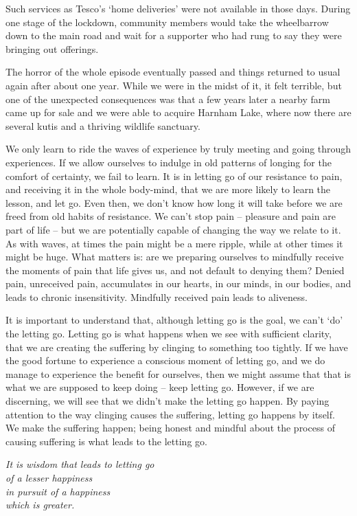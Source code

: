 Such services as Tesco's `home deliveries' were not available in those
days. During one stage of the lockdown, community members would take the
wheelbarrow down to the main road and wait for a supporter who had rung
to say they were bringing out offerings.

The horror of the whole episode eventually passed and things returned to
usual again after about one year. While we were in the midst of it, it
felt terrible, but one of the unexpected consequences was that a few
years later a nearby farm came up for sale and we were able to acquire
Harnham Lake, where now there are several kutis and a thriving wildlife
sanctuary.

We only learn to ride the waves of experience by truly meeting and going
through experiences. If we allow ourselves to indulge in old patterns of
longing for the comfort of certainty, we fail to learn. It is in letting
go of our resistance to pain, and receiving it in the whole body-mind,
that we are more likely to learn the lesson, and let go. Even then, we
don't know how long it will take before we are freed from old habits of
resistance. We can't stop pain -- pleasure and pain are part of life --
but we are potentially capable of changing the way we relate to it. As
with waves, at times the pain might be a mere ripple, while at other
times it might be huge. What matters is: are we preparing ourselves to
mindfully receive the moments of pain that life gives us, and not
default to denying them? Denied pain, unreceived pain, accumulates in
our hearts, in our minds, in our bodies, and leads to chronic
insensitivity. Mindfully received pain leads to aliveness.

It is important to understand that, although letting go is the goal, we
can't `do' the letting go. Letting go is what happens when we see with
sufficient clarity, that we are creating the suffering by clinging to
something too tightly. If we have the good fortune to experience a
conscious moment of letting go, and we do manage to experience the
benefit for ourselves, then we might assume that that is what we are
supposed to keep doing -- keep letting go. However, if we are
discerning, we will see that we didn't make the letting go happen. By
paying attention to the way clinging causes the suffering, letting go
happens by itself. We make the suffering happen; being honest and
mindful about the process of causing suffering is what leads to the
letting go.

\emph{It is wisdom that leads to letting go\\
of a lesser happiness\\
in pursuit of a happiness\\
which is greater.}

